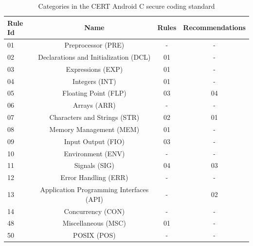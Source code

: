  \begin{table}[h!]
 	\centering
 	
 	\label{tab:andrc}
 	
 	\begin{tabular}{|l|c|c|c|}
 		\hline
 		\textbf{Rule Id} & \textbf{Name} & \textbf{Rules} & \textbf{Recommendations}\\
 		
 		\hline
 		01 & Preprocessor (PRE) & - & -\\
 		\hline
 		
 		02 & Declarations and Initialization (DCL) & 01 & -\\
 		\hline
 		
 		03 & Expressions (EXP) & 01 & -\\
 		\hline
 		
 		04 & Integers (INT) & 01 & -\\
 		\hline
 		
 		05 & Floating Point (FLP) & 03 & 04\\
 		\hline
 		
 		06 & Arrays (ARR) & - & -\\
 		\hline
 		
 		07 & Characters and Strings (STR) & 02 & 01\\
 		\hline
 		
 		08 & Memory Management (MEM) & 01 & -\\
 		\hline
 		
 		09 & Input Output (FIO) & 03 & -\\
 		\hline
 		
 		10 & Environment (ENV) & - & -\\
 		\hline
 		
 		11 & Signals (SIG) & 04 & 03\\
 		\hline
 		
 		12 & Error Handling (ERR) & - & -\\
 		\hline
 		
 		13 & Application Programming Interfaces (API) & - & 02\\
 		\hline
 		
 		14 & Concurrency (CON) & - & -\\
 		\hline
 		
 		48 & Miscellaneous (MSC) & 01 & -\\
 		\hline
 		
 		50 & POSIX (POS) & - & -\\
 		\hline
 		
 	\end{tabular}
 	\caption{Categories in the CERT Android C secure coding standard}
 \end{table}
 
